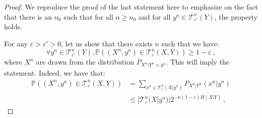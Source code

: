       \begin{proof}
        We reproduce the proof of the last statement here to emphasize on the fact that there is an $n_0$ such that for all $n \geq n_0$ and for all $y^n \in \mathcal{T}^n_{\varepsilon'}(Y)$, the property holds.

        For any $\varepsilon > \varepsilon' > 0$, let us show that there exists $n$ such that we have:
        \[ \forall y^n \in \mathcal{T}^n_{\varepsilon'}(Y), \mathbb{P}\left((X^n,y^n) \in \mathcal{T}^n_{\varepsilon}(X,Y) \right) \geq 1-\varepsilon \ , \]        
        where $X^n$ are drawn from the distribution $P_{X^n|Y^n=y^n}$. This will imply the statement. Indeed, we have that:
        \begin{equation}
          \begin{aligned}
            \mathbb{P}\left((X^n,y^n) \in \mathcal{T}^n_{\varepsilon}(X,Y) \right) &= \sum_{x^n \in \mathcal{T}^n_{\varepsilon}(X|y^n)} P_{X^n|Y^n}(x^n|y^n) \\
            &\leq |\mathcal{T}^n_{\varepsilon}(X|y^n)|2^{-n(1-\varepsilon)H(X|Y)} \ ,
          \end{aligned}
        \end{equation}
      

\end{proof}
